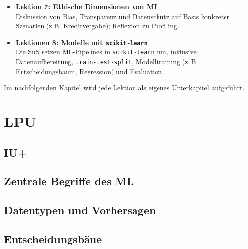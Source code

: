 \documentclass[twocolumn]{article}
\begin{document}
\begin{itemize}
  \item \textbf{Lektion 7: Ethische Dimensionen von ML}\\
  Diskussion von Bias, Transparenz und Datenschutz auf Basis konkreter Szenarien (z.B. Kreditvergabe); Reflexion zu Profiling.

  \item \textbf{Lektionen 8: Modelle mit \texttt{scikit-learn}}\\
  Die SuS setzen ML-Pipelines in \texttt{scikit-learn} um, inklusive Datenaufbereitung, \texttt{train-test-split}, Modelltraining (z. B. Entscheidungsbaum, Regression) und Evaluation.


\end{itemize}

Im nachfolgenden Kapitel wird jede Lektion als eigenes Unterkapitel aufgeführt.

\newpage
\onecolumn
\section{LPU}
\setcounter{subsection}{-1}
\subsection{IU+}


\subsection{Zentrale Begriffe des ML}


\subsection{Datentypen und Vorhersagen}


\subsection{Entscheidungsbäue}

\end{document}
